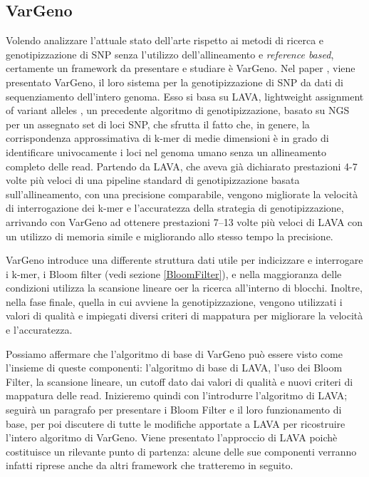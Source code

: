 \documentclass[../main.tex]{subfiles}
\begin{document}
\subsection{VarGeno}
\label{vargeno}
Volendo analizzare l’attuale stato dell’arte rispetto ai metodi di ricerca e genotipizzazione di SNP senza l'utilizzo dell'allineamento e \textit{reference based}, certamente un framework da presentare e studiare è VarGeno. Nel paper \cite{sun-medvedev2018vargeno}, viene presentato VarGeno, il loro sistema per la genotipizzazione di SNP da dati di sequenziamento dell’intero genoma. Esso si basa su LAVA, lightweight assignment of variant alleles \cite{shajii2016lava}, un precedente algoritmo di genotipizzazione, basato su NGS per un assegnato set di loci SNP, che sfrutta il fatto che, in genere, la corrispondenza approssimativa di k-mer di medie dimensioni è in grado di identificare univocamente i loci nel genoma umano senza un allineamento completo delle read. Partendo da LAVA, che aveva già dichiarato prestazioni 4-7 volte più veloci di una pipeline standard di genotipizzazione basata sull’allineamento, con una precisione comparabile, vengono migliorate la velocità di interrogazione dei k-mer e l'accuratezza della strategia di genotipizzazione, arrivando con VarGeno ad ottenere prestazioni 7–13 volte più veloci di LAVA con un utilizzo di memoria simile e migliorando allo stesso tempo la precisione.

VarGeno introduce una differente struttura dati utile per indicizzare e interrogare i k-mer, i Bloom filter (vedi sezione \ref{BloomFilter}), e nella maggioranza delle condizioni utilizza la scansione lineare oer la ricerca all'interno di blocchi. Inoltre, nella fase finale, quella in cui avviene la genotipizzazione, vengono utilizzati i valori di qualità e impiegati diversi criteri di mappatura per migliorare la velocità e l'accuratezza. 

Possiamo affermare che l’algoritmo di base di VarGeno può essere visto come l’insieme di queste componenti: l’algoritmo di base di LAVA, l’uso dei Bloom Filter, la scansione lineare, un cutoff dato dai valori di qualità e nuovi criteri di mappatura delle read. Inizieremo quindi con l’introdurre l’algoritmo di LAVA; seguirà un paragrafo per presentare i Bloom Filter e il loro funzionamento di base, per poi discutere di tutte le modifiche apportate a LAVA per ricostruire l’intero algoritmo di VarGeno. Viene presentato l'approccio di LAVA poichè costituisce un rilevante punto di partenza: alcune delle sue componenti verranno infatti riprese anche da altri framework che tratteremo in seguito.
\end{document}
